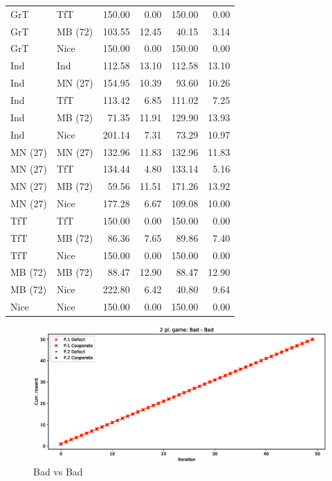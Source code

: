 \documentclass[journal,a4paper,10pt,twoside]{IEEEtran} %
\begin{document}
\begin{table}[ht]
\begin{tabular}{llrrrr}
    	GrT     & TfT     & 150.00 &   0.00 & 150.00 &   0.00 \\
    	GrT     & MB (72) & 103.55 &  12.45 &  40.15 &   3.14 \\
    	GrT     & Nice    & 150.00 &   0.00 & 150.00 &   0.00 \\
    	Ind     & Ind     & 112.58 &  13.10 & 112.58 &  13.10 \\
    	Ind     & MN (27) & 154.95 &  10.39 &  93.60 &  10.26 \\
    	Ind     & TfT     & 113.42 &   6.85 & 111.02 &   7.25 \\
    	Ind     & MB (72) &  71.35 &  11.91 & 129.90 &  13.93 \\
    	Ind     & Nice    & 201.14 &   7.31 &  73.29 &  10.97 \\
    	MN (27) & MN (27) & 132.96 &  11.83 & 132.96 &  11.83 \\
    	MN (27) & TfT     & 134.44 &   4.80 & 133.14 &   5.16 \\
    	MN (27) & MB (72) &  59.56 &  11.51 & 171.26 &  13.92 \\
    	MN (27) & Nice    & 177.28 &   6.67 & 109.08 &  10.00 \\
    	TfT     & TfT     & 150.00 &   0.00 & 150.00 &   0.00 \\
    	TfT     & MB (72) &  86.36 &   7.65 &  89.86 &   7.40 \\
    	TfT     & Nice    & 150.00 &   0.00 & 150.00 &   0.00 \\
    	MB (72) & MB (72) &  88.47 &  12.90 &  88.47 &  12.90 \\
    	MB (72) & Nice    & 222.80 &   6.42 &  40.80 &   9.64 \\
    	Nice    & Nice    & 150.00 &   0.00 & 150.00 &   0.00 \\ \bottomrule
    \end{tabular}
\end{table}

\begin{figure}[!ht]
    \centering
    \includegraphics[width=1\columnwidth]{../img/ipd2p/ipd2p-rewards-Bad-Bad}
    \caption{Bad vs Bad}
    \label{fig:badvsbad}
\end{figure}
\end{document}
